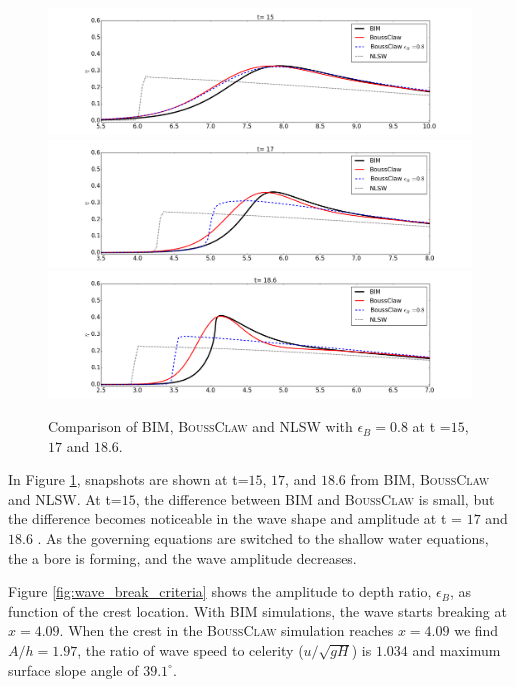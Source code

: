 \documentclass[review]{elsarticle}
\begin{document}
\begin{figure}[!htb]
\centering
\includegraphics[width=.9\textwidth]{_fig/bim_boussclaw_etaB8_150.png}\\
\includegraphics[width=.9\textwidth]{_fig/bim_boussclaw_etaB8_170.png}\\
\includegraphics[width=.9\textwidth]{_fig/bim_boussclaw_etaB8_186.png}
\caption{Comparison of BIM, \textsc{BoussClaw} and NLSW 
with $\epsilon_B=0.8$ at t =$15$, $17$ and $18.6$.}
\label{fig:boussclaw_th08}
\end{figure}

In Figure \ref{fig:boussclaw_th08}, snapshots are shown at 
t=$15$, $17$, and $18.6$ from BIM, \textsc{BoussClaw} 
and NLSW.
At t=$15$, the difference between BIM and \textsc{BoussClaw}
is small, but the difference becomes noticeable 
in the wave shape and amplitude at t = $17$ and $18.6$ . 
As the governing equations are switched to the shallow water equations,
the a bore is forming, and the wave amplitude decreases.

Figure \ref{fig:wave_break_criteria} shows 
the amplitude to depth ratio, $\epsilon_B$, as function of the crest location. 
With BIM simulations, the wave starts breaking at $x=4.09$. 
When the crest in the \textsc{BoussClaw} simulation reaches $x=4.09$ we find
$A/h=1.97$, the ratio of wave speed to celerity ($u/\sqrt{gH}$)
is $1.034$ and maximum surface slope angle of $39.1^\circ$.
\end{document}
